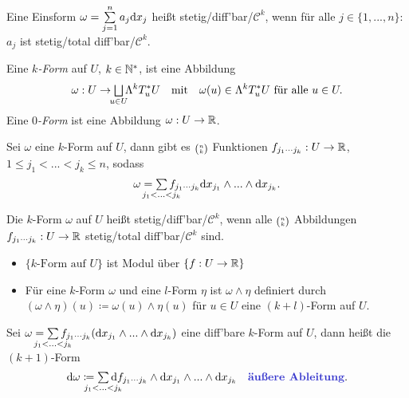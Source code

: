 \documentclass{cheat-sheet}
\theoremstyle{definition}
\let\myBinom\binom
\renewcommand{\binom}[2]{\mathsmaller{\myBinom{#1}{#2}}}
\begin{document}
\begin{defn}
  Eine Einsform $\omega = \sum_{j=1}^n a_j \d x_j$ heißt stetig/diff'bar/$\mathcal{C}^k$, wenn für alle $j \in \{ 1, ..., n \}$: $a_j$ ist stetig/total diff'bar/$\mathcal{C}^k$.
\end{defn}
\fi


\begin{defn}
  Eine \emph{$k$-Form} auf $U$, $k \in \mathbb{N}^*$, ist eine Abbildung
  \[ \omega : U \to \bigsqcup_{\mathclap{u \in U}} \Lambda^k T_u^* U \quad \text{mit} \quad \omega(u) \in \Lambda^k T_u^* U \text{ für alle } u \in U. \]
  Eine \emph{$0$-Form} ist eine Abbildung $\omega : U \to \mathbb{R}$.
\end{defn}


\begin{beobachtung}
  Sei $\omega$ eine $k$-Form auf $U$, dann gibt es $\binom{n}{k}$ Funktionen $f_{j_1 \cdots j_k} : U \to \mathbb{R}$, $1 \leq j_1 < ... < j_k \leq n$, sodass
  \[ \omega = \sum_{\mathclap{j_1 < ... < j_k}} f_{j_1 \cdots j_k} \d x_{j_1} \wedge ... \wedge \d x_{j_k}. \]
\end{beobachtung}

\begin{defn}
  Die $k$-Form $\omega$ auf $U$ heißt stetig/diff'bar/$\mathcal{C}^k$, wenn alle $\binom{n}{k}$ Abbildungen $f_{j_1 \cdots j_k} : U \to \mathbb{R}$ stetig/total diff'bar/$\mathcal{C}^k$ sind.
\end{defn}

\begin{beobachtung}
  \begin{itemize}
    \item $\{ k\text{-Form auf } U \}$ ist Modul über $\{ f : U \to \mathbb{R} \}$
    \item Für eine $k$-Form $\omega$ und eine $l$-Form $\eta$ ist $\omega \wedge \eta$ definiert durch $(\omega \wedge \eta)(u) \coloneqq \omega(u) \wedge \eta(u)$ für $u \in U$ eine $(k{+}l)$-Form auf $U$.
  \end{itemize}
\end{beobachtung}

\begin{defn}
  Sei $\omega = \sum_{\mathclap{j_1 < ... < j_k}} f_{j_1 \cdots j_k} (\d x_{j_1} \wedge ... \wedge \d x_{j_k})$ eine diff'bare $k$-Form auf $U$, dann heißt die $(k{+}1)$-Form
  \[ \d \omega \coloneqq \sum_{\mathclap{j_1 < ... < j_k}} \d f_{j_1 \cdots j_k} \wedge \d x_{j_1} \wedge ... \wedge \d x_{j_k} \quad \text{\emph{äußere Ableitung}}. \]
\end{defn}
\end{document}
